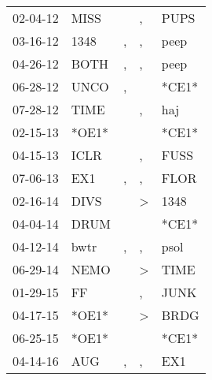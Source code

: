 \begin{supertabular}{p{0.07\textwidth}p{0.06\textwidth}p{0.02\textwidth}p{0.02\textwidth}p{0.06\textwidth}}
 02-04-12\textsuperscript{} &           MISS\textsuperscript{} &               &             , &           PUPS\textsuperscript{} \\
 03-16-12\textsuperscript{} &           1348\textsuperscript{} &             , &             , &           peep\textsuperscript{} \\
 04-26-12\textsuperscript{} &           BOTH\textsuperscript{} &             , &             , &           peep\textsuperscript{} \\
 06-28-12\textsuperscript{} &           UNCO\textsuperscript{} &             , &               &                            *CE1* \\
 07-28-12\textsuperscript{} &           TIME\textsuperscript{} &               &             , &            haj\textsuperscript{} \\
 02-15-13\textsuperscript{} &                            *OE1* &               &               &                            *CE1* \\
 04-15-13\textsuperscript{} &           ICLR\textsuperscript{} &               &             , &           FUSS\textsuperscript{} \\
 07-06-13\textsuperscript{} &            EX1\textsuperscript{} &             , &             , &           FLOR\textsuperscript{} \\
 02-16-14\textsuperscript{} &           DIVS\textsuperscript{} &               &  \textgreater &           1348\textsuperscript{} \\
 04-04-14\textsuperscript{} &           DRUM\textsuperscript{} &               &               &                            *CE1* \\
 04-12-14\textsuperscript{} &           bwtr\textsuperscript{} &             , &             , &           psol\textsuperscript{} \\
 06-29-14\textsuperscript{} &           NEMO\textsuperscript{} &               &  \textgreater &           TIME\textsuperscript{} \\
 01-29-15\textsuperscript{} &             FF\textsuperscript{} &               &             , &           JUNK\textsuperscript{} \\
 04-17-15\textsuperscript{} &                            *OE1* &               &  \textgreater &           BRDG\textsuperscript{} \\
 06-25-15\textsuperscript{} &                            *OE1* &               &               &                            *CE1* \\
 04-14-16\textsuperscript{} &            AUG\textsuperscript{} &             , &             , &            EX1\textsuperscript{} \\

\end{supertabular}
